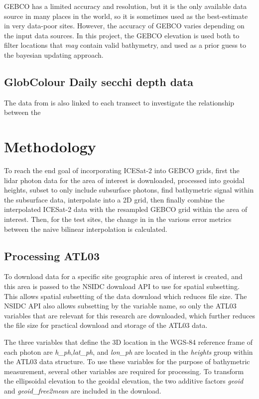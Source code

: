 GEBCO has a limited accuracy and resolution, but it is the only available data source in many places in the world, so it is sometimes used as the best-estimate in very data-poor sites. However, the accuracy of GEBCO varies depending on the input data sources. In this project, the GEBCO elevation is used both to filter locations that \emph{may} contain valid bathymetry, and used as a prior guess to the bayesian updating approach. 

\subsection{GlobColour Daily secchi depth data}

The data from \parencite{Garnesson2019} is also linked to each transect to investigate the relationship between the

\section{Methodology}

To reach the end goal of incorporating ICESat-2 into GEBCO grids, first the lidar photon data for the area of interest is downloaded, processed into geoidal heights, subset to only include subsurface photons, find bathymetric signal within the subsurface data, interpolate into a 2D grid, then finally combine the interpolated ICESat-2 data with the resampled GEBCO grid within the area of interest. Then, for the test sites, the change in in the various error metrics between the naive bilinear interpolation is calculated. 

\subsection{Processing ATL03}
To download data for a specific site geographic area of interest is created, and this area is passed to the NSIDC download API to use for spatial subsetting. This allows spatial subsetting of the data download which reduces file size. The NSIDC API also allows subsetting by the variable name, so only the ATL03 variables that are relevant for this research are downloaded, which further reduces the file size for practical download and storage of the ATL03 data. 

The three variables that define the 3D location in the WGS-84 reference frame of each photon are \emph{h\_ph},\emph{lat\_ph}, and \emph{lon\_ph} are located in the \emph{heights} group within the ATL03 data structure. To use these variables for the purpose of bathymetric measurement, several other variables are required for processing. To transform the ellipsoidal elevation to the geoidal elevation, the two additive factors \emph{geoid} and \emph{geoid\_free2mean} are included in the download.

